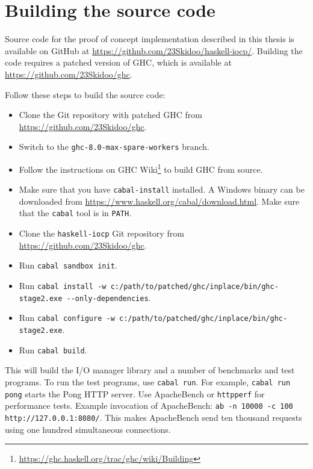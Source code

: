 \documentclass[a4paper,11pt,oneside]{report}
\begin{document}
\chapter{Building the source code}
\label{appendix:building}

Source code for the proof of concept implementation described in this thesis is
available on GitHub at \url{https://github.com/23Skidoo/haskell-iocp/}. Building
the code requires a patched version of GHC, which is available at
\url{https://github.com/23Skidoo/ghc}.

Follow these steps to build the source code:

\begin{itemize}
\item Clone the Git repository with patched GHC from
  \url{https://github.com/23Skidoo/ghc}.
\item Switch to the \texttt{ghc-8.0-max-spare-workers} branch.
\item Follow the instructions on GHC
  Wiki\footnote{\url{https://ghc.haskell.org/trac/ghc/wiki/Building}} to build
  GHC from source.
\item Make sure that you have \texttt{cabal-install} installed. A Windows binary
  can be downloaded from \url{https://www.haskell.org/cabal/download.html}. Make
  sure that the \texttt{cabal} tool is in \texttt{PATH}.
\item Clone the \texttt{haskell-iocp} Git repository from
  \url{https://github.com/23Skidoo/ghc}.
\item Run \texttt{cabal sandbox init}.
\item Run \texttt{cabal install -w c:/path/to/patched/ghc/inplace/bin/ghc-stage2.exe
    -{}-only-dependencies}.
\item Run \texttt{cabal configure -w c:/path/to/patched/ghc/inplace/bin/ghc-stage2.exe}.
\item Run \texttt{cabal build}.
\end{itemize}

This will build the I/O manager library and a number of benchmarks and test
programs. To run the test programs, use \texttt{cabal run}. For example,
\texttt{cabal run pong} starts the Pong HTTP server. Use ApacheBench or
\texttt{httpperf} for performance tests. Example invocation of ApacheBench:
\texttt{ab -n 10000 -c 100 http://127.0.0.1:8080/}. This makes ApacheBench send
ten thousand requests using one hundred simultaneous connections.
\end{document}

